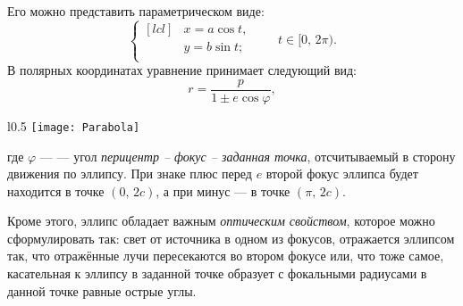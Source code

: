 Его можно представить параметрическом виде:
\begin{equation}
	\left\{
	\begin{aligned}[lcl]
		&x=a\cos t,\\
		&y=b\sin t;\\
	\end{aligned}
	\right. \quad\quad t \in [0, \, 2\pi).
\end{equation}
В полярных координатах уравнение принимает следующий вид:
\begin{equation}
	r=\frac{p}{1\pm e \cos \varphi},
	\label{eq:ellipse-pol-eq}
\end{equation}
\begin{wrapfigure}[11]{l}{0.5\tw}
	\centering
	\vspace{-.7pc}
	\texttt{[image: Parabola]}
\end{wrapfigure}
где $\varphi$ ---  --- угол
{\slshape перицентр -- фокус -- заданная точка},
отсчитываемый в сторону движения по эллипсу. При
знаке плюс перед $e$ второй фокус эллипса будет
находится в точке $(0, \, 2c)$, а при минус --- в
точке $(\pi, \, 2c)$.

Кроме этого, эллипс обладает важным {\itshape оптическим
свойством}, которое можно сформулировать так: свет от источника в одном из фокусов,
отражается эллипсом так, что отражённые лучи пересекаются
во втором фокусе или, что тоже самое, касательная к эллипсу в заданной точке образует с фокальными радиусами в данной точке равные острые углы.

